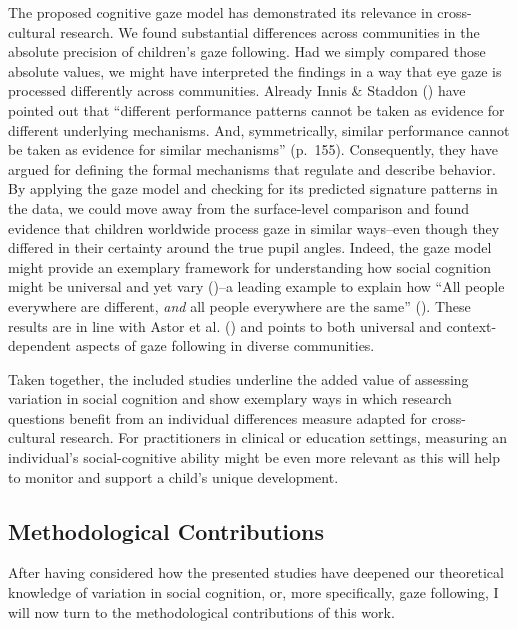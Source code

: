 \documentclass[
]{scrbook}
\begin{document}
The proposed cognitive gaze model has demonstrated its relevance in cross-cultural research. We found substantial differences across communities in the absolute precision of children's gaze following. Had we simply compared those absolute values, we might have interpreted the findings in a way that eye gaze is processed differently across communities. Already Innis \& Staddon () have pointed out that ``different performance patterns cannot be taken as evidence for different underlying mechanisms. And, symmetrically, similar performance cannot be taken as evidence for similar mechanisms'' (p.~155). Consequently, they have argued for defining the formal mechanisms that regulate and describe behavior. By applying the gaze model and checking for its predicted signature patterns in the data, we could move away from the surface-level comparison and found evidence that children worldwide process gaze in similar ways\thinspace --\thinspace even though they differed in their certainty around the true pupil angles. Indeed, the gaze model might provide an exemplary framework for understanding how social cognition might be universal and yet vary ()\thinspace --\thinspace a leading example to explain how ``All people everywhere are different, \emph{and} all people everywhere are the same'' (). These results are in line with Astor et al. () and points to both universal and context-dependent aspects of gaze following in diverse communities.

Taken together, the included studies underline the added value of assessing variation in social cognition and show exemplary ways in which research questions benefit from an individual differences measure adapted for cross-cultural research. For practitioners in clinical or education settings, measuring an individual's social-cognitive ability might be even more relevant as this will help to monitor and support a child's unique development. \newpage

\subsection{Methodological Contributions}\label{contributions-methods}

After having considered how the presented studies have deepened our theoretical knowledge of variation in social cognition, or, more specifically, gaze following, I will now turn to the methodological contributions of this work.
\end{document}
